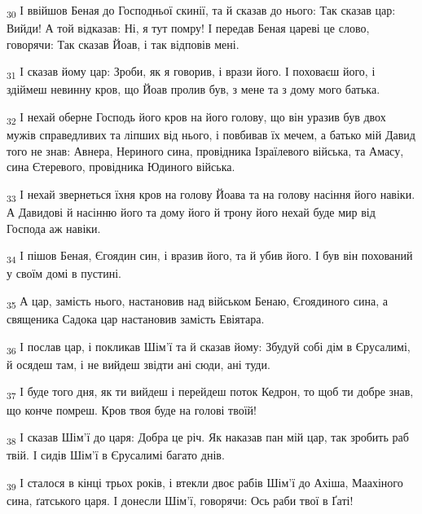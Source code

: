 \begin{tcolorbox}
\textsubscript{30} І ввійшов Беная до Господньої скинії, та й сказав до нього: Так сказав цар: Вийди! А той відказав: Ні, я тут помру! І передав Беная цареві це слово, говорячи: Так сказав Йоав, і так відповів мені.
\end{tcolorbox}
\begin{tcolorbox}
\textsubscript{31} І сказав йому цар: Зроби, як я говорив, і врази його. І поховаєш його, і здіймеш невинну кров, що Йоав пролив був, з мене та з дому мого батька.
\end{tcolorbox}
\begin{tcolorbox}
\textsubscript{32} І нехай оберне Господь його кров на його голову, що він уразив був двох мужів справедливих та ліпших від нього, і повбивав їх мечем, а батько мій Давид того не знав: Авнера, Нериного сина, провідника Ізраїлевого війська, та Амасу, сина Єтеревого, провідника Юдиного війська.
\end{tcolorbox}
\begin{tcolorbox}
\textsubscript{33} І нехай звернеться їхня кров на голову Йоава та на голову насіння його навіки. А Давидові й насінню його та дому його й трону його нехай буде мир від Господа аж навіки.
\end{tcolorbox}
\begin{tcolorbox}
\textsubscript{34} І пішов Беная, Єгоядин син, і вразив його, та й убив його. І був він похований у своїм домі в пустині.
\end{tcolorbox}
\begin{tcolorbox}
\textsubscript{35} А цар, замість нього, настановив над військом Бенаю, Єгоядиного сина, а священика Садока цар настановив замість Евіятара.
\end{tcolorbox}
\begin{tcolorbox}
\textsubscript{36} І послав цар, і покликав Шім'ї та й сказав йому: Збудуй собі дім в Єрусалимі, й осядеш там, і не вийдеш звідти ані сюди, ані туди.
\end{tcolorbox}
\begin{tcolorbox}
\textsubscript{37} І буде того дня, як ти вийдеш і перейдеш поток Кедрон, то щоб ти добре знав, що конче помреш. Кров твоя буде на голові твоїй!
\end{tcolorbox}
\begin{tcolorbox}
\textsubscript{38} І сказав Шім'ї до царя: Добра це річ. Як наказав пан мій цар, так зробить раб твій. І сидів Шім'ї в Єрусалимі багато днів.
\end{tcolorbox}
\begin{tcolorbox}
\textsubscript{39} І сталося в кінці трьох років, і втекли двоє рабів Шім'ї до Ахіша, Маахіного сина, ґатського царя. І донесли Шім'ї, говорячи: Ось раби твої в Ґаті!
\end{tcolorbox}
